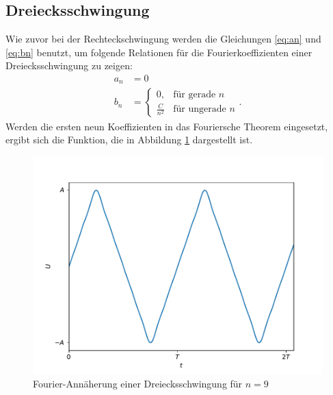 \subsection{Dreiecksschwingung}
Wie zuvor bei der Rechteckschwingung werden die Gleichungen \eqref{eq:an} und \eqref{eq:bn} benutzt, um folgende Relationen für die Fourierkoeffizienten einer Dreiecksschwingung zu zeigen:
\begin{align*}
    a_n &= 0 \\
    b_n &= 
    \begin{cases}
    0 ,     & \text {für gerade $n$} \\
    \frac{C}{n^2} & \text {für ungerade $n$}
    \end{cases} .
\end{align*}
Werden die ersten neun Koeffizienten in das Fouriersche Theorem eingesetzt, ergibt sich die Funktion, die in Abbildung \ref{fig:vorbereitung_dreieck} dargestellt ist.
\begin{figure}[h]
  \centering
  \includegraphics[width=\textwidth]{assets/fourier_dreieck.pdf}
  \caption{Fourier-Annäherung einer Dreiecksschwingung für $n=9$}
  \label{fig:vorbereitung_dreieck}
\end{figure}
